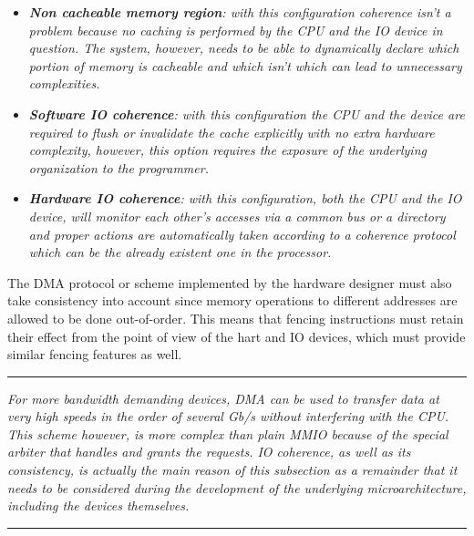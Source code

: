 \documentclass{article}
\begin{document}
            \begin{itemize}

                \item \textit{\textbf{Non cacheable memory region}: with this configuration coherence isn't a problem because no caching is performed by the CPU and the IO device in question. The system, however, needs to be able to dynamically declare which portion of memory is cacheable and which isn't which can lead to unnecessary complexities.}

                \item \textit{\textbf{Software IO coherence}: with this configuration the CPU and the device are required to flush or invalidate the cache explicitly with no extra hardware complexity, however, this option requires the exposure of the underlying organization to the programmer.}

                \item \textit{\textbf{Hardware IO coherence}: with this configuration, both the CPU and the IO device, will monitor each other's accesses via a common bus or a directory and proper actions are automatically taken according to a coherence protocol which can be the already existent one in the processor.}

            \end{itemize}

            The DMA protocol or scheme implemented by the hardware designer must also take consistency into account since memory operations to different addresses are allowed to be done out-of-order. This means that fencing instructions must retain their effect from the point of view of the hart and IO devices, which must provide similar fencing features as well.

        \par\noindent\rule{\textwidth}{0.4pt}
        \textit{For more bandwidth demanding devices, DMA can be used to transfer data at very high speeds in the order of several Gb/s without interfering with the CPU. This scheme however, is more complex than plain MMIO because of the special arbiter that handles and grants the requests. IO coherence, as well as its consistency, is actually the main reason of this subsection as a remainder that it needs to be considered during the development of the underlying microarchitecture, including the devices themselves.}
        \par\noindent\rule{\textwidth}{0.4pt}

    \clearpage
\end{document}
